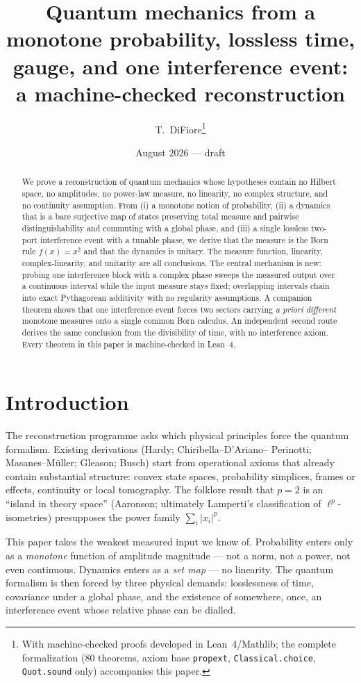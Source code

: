 \documentclass[11pt]{article}
\title{Quantum mechanics from a monotone probability, lossless time,
gauge, and one interference event:\\ a machine-checked reconstruction}
\author{T.~DiFiore\thanks{With machine-checked proofs developed in
Lean~4/Mathlib; the complete formalization (80 theorems, axiom base
\texttt{propext}, \texttt{Classical.choice}, \texttt{Quot.sound} only)
accompanies this paper.}}
\date{August 2026 --- draft}
\begin{document}
\maketitle

\begin{abstract}
We prove a reconstruction of quantum mechanics whose hypotheses contain
no Hilbert space, no amplitudes, no power-law measure, no linearity, no
complex structure, and no continuity assumption.  From (i) a monotone
notion of probability, (ii) a dynamics that is a bare surjective map of
states preserving total measure and pairwise distinguishability and
commuting with a global phase, and (iii) a single lossless two-port
interference event with a tunable phase, we derive that the measure is
the Born rule $f(x)=x^2$ and that the dynamics is unitary.  The measure
function, linearity, complex-linearity, and unitarity are all
conclusions.  The central mechanism is new: probing one interference
block with a complex phase sweeps the measured output over a continuous
interval while the input measure stays fixed; overlapping intervals
chain into exact Pythagorean additivity with no regularity assumptions.
A companion theorem shows that one interference event forces two
sectors carrying \emph{a priori different} monotone measures onto a
single common Born calculus.  An independent second route derives the
same conclusion from the divisibility of time, with no interference
axiom.  Every theorem in this paper is machine-checked in Lean~4.
\end{abstract}

\section{Introduction}

The reconstruction programme asks which physical principles force the
quantum formalism.  Existing derivations (Hardy; Chiribella--D'Ariano--
Perinotti; Masanes--M\"uller; Gleason; Busch) start from operational
axioms that already contain substantial structure: convex state spaces,
probability simplices, frames or effects, continuity or local
tomography.  The folklore result that $p=2$ is an ``island in theory
space'' (Aaronson; ultimately Lamperti's classification of
$\ell^p$-isometries) presupposes the power family
$\sum_i \lvert x_i\rvert^p$.

This paper takes the weakest measured input we know of.  Probability
enters only as a \emph{monotone} function of amplitude magnitude ---
not a norm, not a power, not even continuous.  Dynamics enters as a
\emph{set map} --- no linearity.  The quantum formalism is then forced
by three physical demands: losslessness of time, covariance under a
global phase, and the existence of somewhere, once, an interference
event whose relative phase can be dialled.
\end{document}
